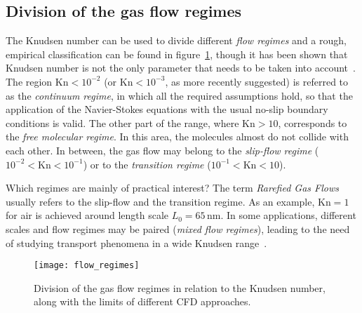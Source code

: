 \subsection{Division of the gas flow regimes}
The Knudsen number can be used to divide different \textit{flow regimes} and a
rough, empirical classification can be found in figure~\ref{fig:flow_regimes},
though it has been shown that Knudsen number is not the only parameter that needs
to be taken into account~\cite{Barber2006}.
The region $\mathrm{Kn}<10^{-2}$ (or $\mathrm{Kn}<10^{-3}$, as more recently suggested)
is referred to as the \textit{continuum regime}, in which all the required
assumptions hold, so that the application of the Navier-Stokes equations with the usual
no-slip boundary conditions is valid.
The other part of the range, where $\mathrm{Kn}>10$, corresponds to the
\textit{free molecular regime}. In this area, the molecules almost do not collide
with each other.
In between, the gas flow may belong to the \textit{slip-flow regime}
($10^{-2} < \mathrm{Kn} < 10^{-1} $) or to the \textit{transition regime}
($10^{-1} < \mathrm{Kn} < 10 $). 

Which regimes are mainly of practical interest? The term \textit{Rarefied Gas Flows} 
usually refers to the slip-flow and the
transition regime. As an example, $\mathrm{Kn}=1$ for air 
is achieved around length scale $L_0 = 65\,\mathrm{nm}$.
In some applications, different scales and flow regimes may be paired (\textit{mixed flow regimes}),
leading to the need of studying transport phenomena in a wide Knudsen range~\cite{Karniadakis_Microflows}.

\begin{figure}[h!]%
 	\begin{center}%
 		\texttt{[image: flow\_regimes]}%
 		\caption{Division of the gas flow regimes in relation to the Knudsen %
 		number, along with the limits of different CFD %
 		approaches.~\cite{Zhang2012}}%
 		\label{fig:flow_regimes}%
 	\end{center}%
\end{figure}

